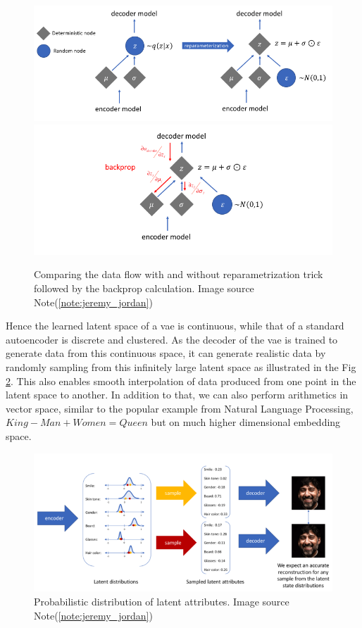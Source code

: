 \begin{figure}[h]
    \centering
    \includegraphics[width=\textwidth]{figures/background/reparametrization_trick.png}
    \includegraphics[width=\textwidth]{figures/background/reparametrization_trick_backprop.png}
    \caption{Comparing the data flow with and without reparametrization trick followed by the backprop calculation. Image source Note(\ref{note:jeremy_jordan})}
    \label{fig:reparametrization_trick}
\end{figure}

Hence the learned latent space of a \ac{vae} is continuous, while that of a standard autoencoder is discrete and clustered. As the decoder of the \ac{vae} is trained to generate data from this continuous space, it can generate realistic data by randomly sampling from this infinitely large latent space as illustrated in the Fig \ref{fig:vae_latent_attribute}. This also enables smooth interpolation of data produced from one point in the latent space to another. In addition to that, we can also perform arithmetics in vector space, similar to the popular example from Natural Language Processing, $King - Man + Women = Queen$ but on much higher dimensional embedding space.

\begin{figure}[h]
    \centering
    \includegraphics[width=\textwidth]{figures/background/vae_latent_attribute.png}
    \caption{Probabilistic distribution of latent attributes. Image source Note(\ref{note:jeremy_jordan})}
    \label{fig:vae_latent_attribute}
\end{figure}

